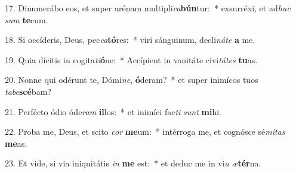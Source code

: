 17. Dinumerábo eos, et super arénam multipli\textit{ca}\textbf{bún}tur:~*  exsurréxi, et ad\textit{huc} \textit{sum} \textbf{te}cum.\

18. Si occíderis, Deus, pec\textit{ca}\textbf{tó}res:~*  viri sánguinum, decli\textit{ná}\textit{te} \textbf{a} me.\

19. Quia dícitis in cogita\textit{ti}\textbf{ó}ne:~*  Accípient in vanitáte civi\textit{tá}\textit{tes} \textbf{tu}as.\

20. Nonne qui odérunt te, Dómi\textit{ne}, \textbf{ó}deram?~*  et super inimícos tuos \textit{ta}\textit{be}\textbf{scé}bam?\

21. Perfécto ódio óde\textit{ram} \textbf{il}los:~*  et inimíci fac\textit{ti} \textit{sunt} \textbf{mi}hi.\

22. Proba me, Deus, et scito \textit{cor} \textbf{me}um:~*  intérroga me, et cognósce sé\textit{mi}\textit{tas} \textbf{me}as.\

23. Et vide, si via iniquitátis \textit{in} \textbf{me} est:~*  et deduc me in vi\textit{a} \textit{æ}\textbf{tér}na.\

